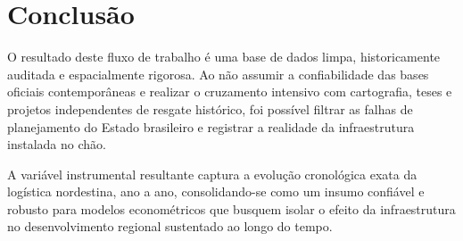 \documentclass[11pt, a4paper]{article}
\begin{document}
\section{Conclusão}

O resultado deste fluxo de trabalho é uma base de dados limpa, historicamente auditada e espacialmente rigorosa. Ao não assumir a confiabilidade das bases oficiais contemporâneas e realizar o cruzamento intensivo com cartografia, teses e projetos independentes de resgate histórico, foi possível filtrar as falhas de planejamento do Estado brasileiro e registrar a realidade da infraestrutura instalada no chão. 

A variável instrumental resultante captura a evolução cronológica exata da logística nordestina, ano a ano, consolidando-se como um insumo confiável e robusto para modelos econométricos que busquem isolar o efeito da infraestrutura no desenvolvimento regional sustentado ao longo do tempo.
\end{document}
